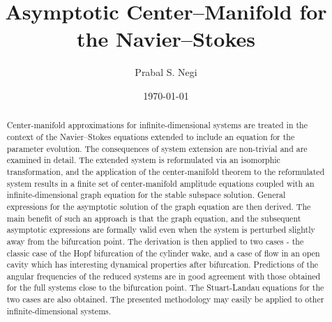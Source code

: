 \documentclass[aps,prr,twocolumn,groupedaddress]{revtex4-2}
\begin{document}
	
\title{Asymptotic Center--Manifold for the Navier--Stokes}
\author{Prabal S. Negi}

\date{\today}

\begin{abstract}
Center-manifold approximations for infinite-dimensional systems are treated in the context of the Navier--Stokes equations extended to include an equation for the parameter evolution. The consequences of system extension are non-trivial and are examined in detail. The extended system is reformulated via an isomorphic transformation, and the application of the center-manifold theorem to the reformulated system results in a finite set of center-manifold amplitude equations coupled with an infinite-dimensional graph equation for the stable subspace solution. General expressions for the asymptotic solution of the graph equation are then derived. The main benefit of such an approach is that the graph equation, and the subsequent asymptotic expressions are formally valid even when the system is perturbed slightly away from the bifurcation point. The derivation is then applied to two cases - the classic case of the Hopf bifurcation of the cylinder wake, and a case of flow in an open cavity which has interesting dynamical properties after bifurcation. Predictions of the angular frequencies of the reduced systems are in good agreement with those obtained for the full systems close to the bifurcation point. The Stuart-Landau equations for the two cases are also obtained. The presented methodology may easily be applied to other infinite-dimensional systems. 
\end{abstract}

\maketitle







\FloatBarrier



\end{document}
